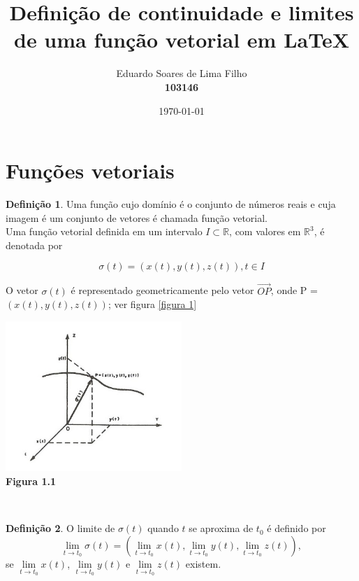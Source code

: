 \documentclass[12pt, a4paper]{article}
\title{\textbf{Definição de continuidade e limites de uma função vetorial em \LaTeX}}
\author{Eduardo Soares de Lima Filho
\\ \textbf{103146}}
\date{\today} %
\theoremstyle{definition} %
\newtheorem{defi}{Definição}[section]%
\begin{document}
	\maketitle %
	\newpage %
	
	\tableofcontents %
	
	\newpage
	
	\section{Funções vetoriais \cite{livrocalc3}}
	
	\begin{defi}%
	Uma função cujo domínio é o conjunto de números reais e cuja imagem é um conjunto de vetores é
	chamada função vetorial.
	\\
	Uma função vetorial definida em um intervalo $I \subset \mathds{R}$, com valores em $\mathds{R}^3$,
	é denotada por
	
	\begin{equation}
		\sigma(t) = (x(t), y(t), z(t)), t \in I
		\label{eq: 1}
	\end{equation}	 
	 
	
	
	O vetor $\sigma(t)$ é representado geometricamente pelo vetor $\stackrel{\longrightarrow}{OP}$, onde
	P = $(x(t),y(t),z(t))$; ver figura \ref{figura 1}
	
	\begin{center}
		\includegraphics[width=0.5\textwidth]{grafico.png}
		\label{figura 1}
		\\ 
		\textbf{Figura 1.1} 
	\end{center}
	\end{defi}
	\\
	
	\begin{defi}\label{def1.2}%
	O limite de $\sigma(t)$ quando $t$ se aproxima de $t_0$ é definido por 
	$$\lim_{t\to t_0}\sigma(t) = (\lim_{t\to t_0}x(t),\lim_{t\to t_0}y(t),
	\lim_{t\to t_0}z(t)),$$ 
	se $\lim\limits_{t\to t_0}x(t)$, $\lim\limits_{t\to t_0}y(t)$ e $\lim\limits_{t\to t_0}z(t)$ existem.
	\end{defi}	
	\\
	
\end{document}
